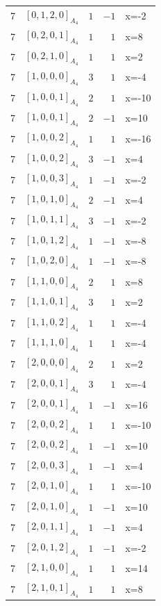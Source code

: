 \documentclass[11pt]{article}
\newcommand{\Dynkin}[1]{#1}
\begin{document}
\begin{longtable}{r l r r l}
7 & $\Dynkin{[0,1,2,0]_{A_4}}$ & $1$ & $-1$ & x=-2\\
7 & $\Dynkin{[0,2,0,1]_{A_4}}$ & $1$ & $1$ & x=8\\
7 & $\Dynkin{[0,2,1,0]_{A_4}}$ & $1$ & $1$ & x=2\\
7 & $\Dynkin{[1,0,0,0]_{A_4}}$ & $3$ & $1$ & x=-4\\
7 & $\Dynkin{[1,0,0,1]_{A_4}}$ & $2$ & $1$ & x=-10\\
7 & $\Dynkin{[1,0,0,1]_{A_4}}$ & $2$ & $-1$ & x=10\\
7 & $\Dynkin{[1,0,0,2]_{A_4}}$ & $1$ & $1$ & x=-16\\
7 & $\Dynkin{[1,0,0,2]_{A_4}}$ & $3$ & $-1$ & x=4\\
7 & $\Dynkin{[1,0,0,3]_{A_4}}$ & $1$ & $-1$ & x=-2\\
7 & $\Dynkin{[1,0,1,0]_{A_4}}$ & $2$ & $-1$ & x=4\\
7 & $\Dynkin{[1,0,1,1]_{A_4}}$ & $3$ & $-1$ & x=-2\\
7 & $\Dynkin{[1,0,1,2]_{A_4}}$ & $1$ & $-1$ & x=-8\\
7 & $\Dynkin{[1,0,2,0]_{A_4}}$ & $1$ & $-1$ & x=-8\\
7 & $\Dynkin{[1,1,0,0]_{A_4}}$ & $2$ & $1$ & x=8\\
7 & $\Dynkin{[1,1,0,1]_{A_4}}$ & $3$ & $1$ & x=2\\
7 & $\Dynkin{[1,1,0,2]_{A_4}}$ & $1$ & $1$ & x=-4\\
7 & $\Dynkin{[1,1,1,0]_{A_4}}$ & $1$ & $1$ & x=-4\\
7 & $\Dynkin{[2,0,0,0]_{A_4}}$ & $2$ & $1$ & x=2\\
7 & $\Dynkin{[2,0,0,1]_{A_4}}$ & $3$ & $1$ & x=-4\\
7 & $\Dynkin{[2,0,0,1]_{A_4}}$ & $1$ & $-1$ & x=16\\
7 & $\Dynkin{[2,0,0,2]_{A_4}}$ & $1$ & $1$ & x=-10\\
7 & $\Dynkin{[2,0,0,2]_{A_4}}$ & $1$ & $-1$ & x=10\\
7 & $\Dynkin{[2,0,0,3]_{A_4}}$ & $1$ & $-1$ & x=4\\
7 & $\Dynkin{[2,0,1,0]_{A_4}}$ & $1$ & $1$ & x=-10\\
7 & $\Dynkin{[2,0,1,0]_{A_4}}$ & $1$ & $-1$ & x=10\\
7 & $\Dynkin{[2,0,1,1]_{A_4}}$ & $1$ & $-1$ & x=4\\
7 & $\Dynkin{[2,0,1,2]_{A_4}}$ & $1$ & $-1$ & x=-2\\
7 & $\Dynkin{[2,1,0,0]_{A_4}}$ & $1$ & $1$ & x=14\\
7 & $\Dynkin{[2,1,0,1]_{A_4}}$ & $1$ & $1$ & x=8\\

\end{longtable}
\end{document}
